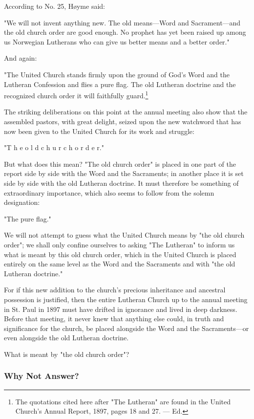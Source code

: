 According to No. 25, Høyme said:

"We will not invent anything new. The old means—Word and Sacrament—and the old church order are good enough. No prophet has yet been raised up among us Norwegian Lutherans who can give us better means and a better order."

And again:

"The United Church stands firmly upon the ground of God’s Word and the Lutheran Confession and flies a pure flag. The old Lutheran doctrine and the recognized church order it will faithfully guard.\footnote{The quotations cited here after "The Lutheran" are found in the United Church’s Annual Report, 1897, pages 18 and 27. — Ed.}

The striking deliberations on this point at the annual meeting also show that the assembled pastors, with great delight, seized upon the new watchword that has now been given to the United Church for its work and struggle:

"T h e  o l d  c h u r c h  o r d e r."

But what does this mean? "The old church order" is placed in one part of the report side by side with the Word and the Sacraments; in another place it is set side by side with the old Lutheran doctrine. It must therefore be something of extraordinary importance, which also seems to follow from the solemn designation:

"The pure flag."

We will not attempt to guess what the United Church means by "the old church order"; we shall only confine ourselves to asking "The Lutheran" to inform us what is meant by this old church order, which in the United Church is placed entirely on the same level as the Word and the Sacraments and with "the old Lutheran doctrine."

For if this new addition to the church’s precious inheritance and ancestral possession is justified, then the entire Lutheran Church up to the annual meeting in St. Paul in 1897 must have drifted in ignorance and lived in deep darkness. Before that meeting, it never knew that anything else could, in truth and significance for the church, be placed alongside the Word and the Sacraments—or even alongside the old Lutheran doctrine.

What is meant by "the old church order"?


\subsubsection{Why Not Answer?}

